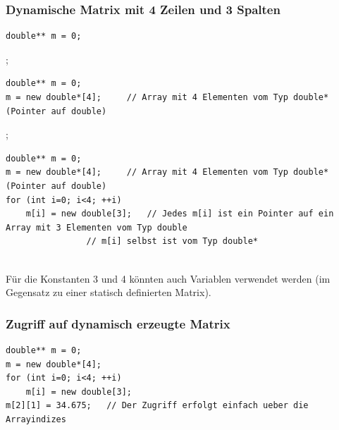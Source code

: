 \subsubsection{Dynamische Matrix mit 4 Zeilen und 3 Spalten}
\label{sec:Dynamische Matrix mit 4 Zeilen und 3 Spalten}
\noindent
\begin{minipage}{\linewidth}
\begin{lstlisting}
double** m = 0;
\end{lstlisting}
\end{minipage}
\begin{figure}[h]
	\centering
	
\end{figure}
\vspace{5mm};
\noindent
\begin{minipage}{\linewidth}
\begin{lstlisting}
double** m = 0;
m = new double*[4];		// Array mit 4 Elementen vom Typ double* (Pointer auf double)
\end{lstlisting}
\end{minipage}
\begin{figure}[h]
	\centering
	
\end{figure}
\vspace{5mm};
\noindent
\begin{minipage}{\linewidth}
\begin{lstlisting}
double** m = 0;
m = new double*[4];		// Array mit 4 Elementen vom Typ double* (Pointer auf double)
for (int i=0; i<4; ++i)	
	m[i] = new double[3];	// Jedes m[i] ist ein Pointer auf ein Array mit 3 Elementen vom Typ double
				// m[i] selbst ist vom Typ double*	
\end{lstlisting}
\end{minipage}
\begin{figure}[hh]
	\centering
	
\end{figure}
\\
Für die Konstanten 3 und 4 könnten auch Variablen verwendet werden (im Gegensatz zu einer statisch definierten Matrix).

\subsubsection{Zugriff auf dynamisch erzeugte Matrix}
\label{sec:Zugriff auf dynamisch erzeugte Matrix}
\noindent
\begin{minipage}{\linewidth}
\begin{lstlisting}
double** m = 0;
m = new double*[4];
for (int i=0; i<4; ++i)	
	m[i] = new double[3];	
m[2][1] = 34.675;	// Der Zugriff erfolgt einfach ueber die Arrayindizes	
\end{lstlisting}
\end{minipage}
\begin{figure}[hh]
	\centering
	
\end{figure}
\vspace{1cm}
\\

